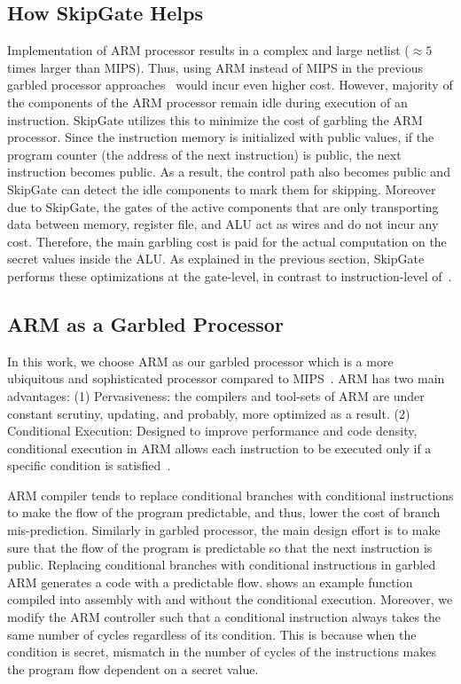 \subsection{How SkipGate Helps}
Implementation of ARM processor results in a complex and large netlist ($\approx 5$ times larger than MIPS).
Thus, using ARM instead of MIPS in the previous garbled processor approaches~\cite{wang2015secure, songhori2016garbledcpu} would incur even higher cost.
However, majority of the components of the ARM processor remain idle during  execution of an instruction.
SkipGate utilizes this to minimize the cost of garbling the ARM processor.
Since the instruction memory is initialized with public values, if the program counter (the address of the next instruction) is public, the next instruction becomes public.
As a result, the control path also becomes public and SkipGate can detect the idle components to mark them for skipping.
Moreover due to SkipGate, the gates of the active components that are only transporting data between memory, register file, and ALU act as wires and do not incur any cost.
Therefore, the main garbling cost is paid for the actual computation on the secret values inside the ALU.
As explained in the previous section, SkipGate performs these optimizations at the gate-level, in contrast to instruction-level of~\cite{wang2015secure, songhori2016garbledcpu}.

\subsection{ARM as a Garbled Processor}\label{ssect:arm}
In this work, we choose ARM as our garbled processor which is a more ubiquitous and sophisticated processor compared to MIPS~\cite{songhori2015tinygarble, wang2015secure, songhori2016garbledcpu}.
ARM has two main advantages:
(1) Pervasiveness: the compilers and tool-sets of ARM are under constant scrutiny, updating, and probably, more optimized as a result.
(2) Conditional Execution: Designed to improve performance and code density, conditional execution in ARM allows each instruction to be executed only if a specific condition is satisfied~\cite{sloss2004arm}.

ARM compiler tends to replace conditional branches with conditional instructions to make the flow of the program predictable, and thus, lower the cost of branch mis-prediction.
Similarly in garbled processor, the main design effort is to make sure that the flow of the program is predictable so that the next instruction is public.
Replacing conditional branches with conditional instructions in garbled ARM generates a code with a predictable flow.
 shows an example function compiled into assembly with and without the conditional execution.
Moreover, we modify the ARM controller such that a conditional instruction always takes the same number of cycles regardless of its condition.
This is because when the condition is secret, mismatch in the number of cycles of the instructions makes the program flow dependent on a secret value.

